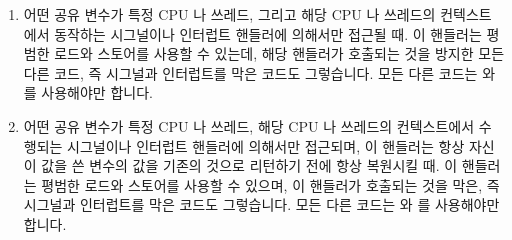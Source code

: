 \begin{enumerate}
\item	어떤 공유 변수가 특정 CPU 나 쓰레드, 그리고 해당 CPU 나 쓰레드의
	컨텍스트에서 동작하는 시그널이나 인터럽트 핸들러에 의해서만 접근될 때.
	이 핸들러는 평범한 로드와 스토어를 사용할 수 있는데, 해당 핸들러가
	호출되는 것을 방지한 모든 다른 코드, 즉 시그널과 인터럽트를 막은 코드도
	그렇습니다.
	모든 다른 코드는  와  를
	사용해야만 합니다.
\item	어떤 공유 변수가 특정 CPU 나 쓰레드, 해당 CPU 나 쓰레드의 컨텍스트에서
	수행되는 시그널이나 인터럽트 핸들러에 의해서만 접근되며, 이 핸들러는
	항상 자신이 값을 쓴 변수의 값을 기존의 것으로 리턴하기 전에 항상
	복원시킬 때.
	이 핸들러는 평범한 로드와 스토어를 사용할 수 있으며, 이 핸들러가
	호출되는 것을 막은, 즉 시그널과 인터럽트를 막은 코드도 그렇습니다.
	모든 다른 코드는  와  를
	사용해야만 합니다.

\end{enumerate}

